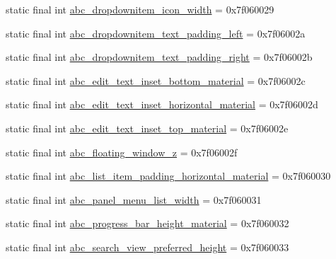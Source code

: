 \begin{DoxyCompactItemize}
static final int \mbox{\hyperlink{classcom_1_1synnapps_1_1carouselview_1_1_r_1_1dimen_abc1f58cf1473cb09734b326edb0e2eb5}{abc\+\_\+dropdownitem\+\_\+icon\+\_\+width}} = 0x7f060029
\item 
static final int \mbox{\hyperlink{classcom_1_1synnapps_1_1carouselview_1_1_r_1_1dimen_a6d63bfdcb9fbe7a3ebca0c72f2fb4c7b}{abc\+\_\+dropdownitem\+\_\+text\+\_\+padding\+\_\+left}} = 0x7f06002a
\item 
static final int \mbox{\hyperlink{classcom_1_1synnapps_1_1carouselview_1_1_r_1_1dimen_a82271a621bd8df418b3cdd50cb036714}{abc\+\_\+dropdownitem\+\_\+text\+\_\+padding\+\_\+right}} = 0x7f06002b
\item 
static final int \mbox{\hyperlink{classcom_1_1synnapps_1_1carouselview_1_1_r_1_1dimen_a36cbb67d1fce28ef2a72462221d74189}{abc\+\_\+edit\+\_\+text\+\_\+inset\+\_\+bottom\+\_\+material}} = 0x7f06002c
\item 
static final int \mbox{\hyperlink{classcom_1_1synnapps_1_1carouselview_1_1_r_1_1dimen_a03c935220011a5cddb2413c01a522822}{abc\+\_\+edit\+\_\+text\+\_\+inset\+\_\+horizontal\+\_\+material}} = 0x7f06002d
\item 
static final int \mbox{\hyperlink{classcom_1_1synnapps_1_1carouselview_1_1_r_1_1dimen_afbbe52f12c708297d86659e2ffc30b12}{abc\+\_\+edit\+\_\+text\+\_\+inset\+\_\+top\+\_\+material}} = 0x7f06002e
\item 
static final int \mbox{\hyperlink{classcom_1_1synnapps_1_1carouselview_1_1_r_1_1dimen_aa98e37708fca12b3ad37be1ef0e04b34}{abc\+\_\+floating\+\_\+window\+\_\+z}} = 0x7f06002f
\item 
static final int \mbox{\hyperlink{classcom_1_1synnapps_1_1carouselview_1_1_r_1_1dimen_a401fdce3547aee0ce3a3e950cf1d1d90}{abc\+\_\+list\+\_\+item\+\_\+padding\+\_\+horizontal\+\_\+material}} = 0x7f060030
\item 
static final int \mbox{\hyperlink{classcom_1_1synnapps_1_1carouselview_1_1_r_1_1dimen_a5dddcce41d4e5add34ee757c47bcb6f4}{abc\+\_\+panel\+\_\+menu\+\_\+list\+\_\+width}} = 0x7f060031
\item 
static final int \mbox{\hyperlink{classcom_1_1synnapps_1_1carouselview_1_1_r_1_1dimen_a93d49b0bd4510a2ac52b31b11d608ae4}{abc\+\_\+progress\+\_\+bar\+\_\+height\+\_\+material}} = 0x7f060032
\item 
static final int \mbox{\hyperlink{classcom_1_1synnapps_1_1carouselview_1_1_r_1_1dimen_ab80a1a226e0e1ae297148d2d4913cf15}{abc\+\_\+search\+\_\+view\+\_\+preferred\+\_\+height}} = 0x7f060033
\item 

\end{DoxyCompactItemize}
